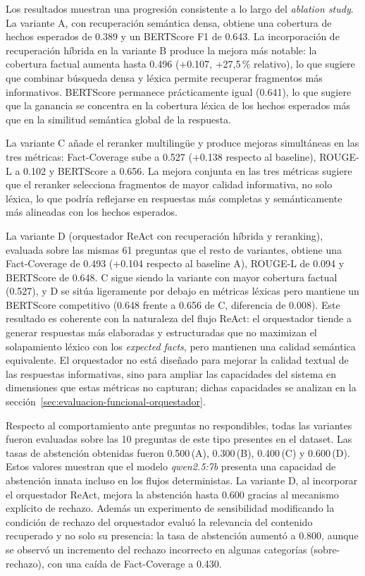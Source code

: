 Los resultados muestran una progresión consistente a lo largo del \textit{ablation study}. 
La variante A, con recuperación semántica densa, obtiene una cobertura de hechos esperados de 0.389 y un BERTScore F1 de 0.643. 
La incorporación de recuperación híbrida en la variante B produce la mejora más notable: la cobertura factual aumenta hasta 0.496 (+0.107, +27,5\,\% relativo), lo que sugiere que combinar búsqueda densa y léxica permite recuperar fragmentos más informativos. 
BERTScore permanece prácticamente igual (0.641), lo que sugiere que la ganancia se concentra en la cobertura léxica de los hechos esperados más que en la similitud semántica global de la respuesta.

La variante C añade el reranker multilingüe y produce mejoras simultáneas en las tres métricas: Fact-Coverage sube a 0.527 (+0.138 respecto al baseline), ROUGE-L a 0.102 y BERTScore a 0.656. 
La mejora conjunta en las tres métricas sugiere que el reranker selecciona fragmentos de mayor calidad informativa, no solo léxica, lo que podría reflejarse en respuestas más completas y semánticamente más alineadas con los hechos esperados.

La variante D (orquestador ReAct con recuperación híbrida y reranking), evaluada sobre las mismas 61 preguntas que el resto de variantes, obtiene una Fact-Coverage de 0.493 (+0.104 respecto al baseline A), ROUGE-L de 0.094 y BERTScore de 0.648.
C sigue siendo la variante con mayor cobertura factual (0.527), y D se sitúa ligeramente por debajo en métricas léxicas pero mantiene un BERTScore competitivo (0.648 frente a 0.656 de C, diferencia de 0.008).
Este resultado es coherente con la naturaleza del flujo ReAct: el orquestador tiende a generar respuestas más elaboradas y estructuradas que no maximizan el solapamiento léxico con los \textit{expected facts}, pero mantienen una calidad semántica equivalente.
El orquestador no está diseñado para mejorar la calidad textual de las respuestas informativas, sino para ampliar las capacidades del sistema en dimensiones que estas métricas no capturan; dichas capacidades se analizan en la sección~\ref{sec:evaluacion-funcional-orquestador}.

Respecto al comportamiento ante preguntas no respondibles, todas las variantes fueron evaluadas sobre las 10 preguntas de este tipo presentes en el dataset.
Las tasas de abstención obtenidas fueron 0.500\,(A), 0.300\,(B), 0.400\,(C) y 0.600\,(D).
Estos valores muestran que el modelo \textit{qwen2.5:7b} presenta una capacidad de abstención innata incluso en los flujos deterministas.
La variante D, al incorporar el orquestador ReAct, mejora la abstención hasta 0.600 gracias al mecanismo explícito de rechazo.
Además un experimento de sensibilidad modificando la condición de rechazo del orquestador evaluó la relevancia del contenido recuperado y no solo su presencia: la tasa de abstención aumentó a 0.800, aunque se observó un incremento del rechazo incorrecto en algunas categorías (sobre-rechazo), con una caída de Fact-Coverage a 0.430.

